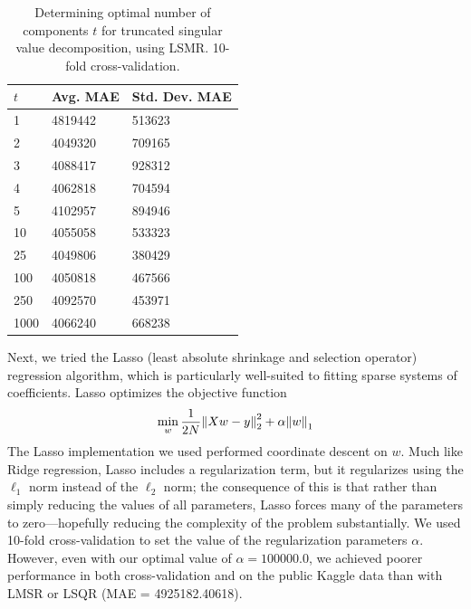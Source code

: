 \documentclass[11pt]{amsart}
\begin{document}
\begin{table}[h]
\begin{tabular}{@{}lll@{}}
\toprule
$t$           & Avg. MAE & Std. Dev. MAE \\ \midrule
1             & 4819442  & 513623        \\
2             & 4049320  & 709165        \\
3             & 4088417  & 928312        \\
4             & 4062818  & 704594        \\
5             & 4102957  & 894946        \\
10            & 4055058  & 533323        \\
25            & 4049806  & 380429        \\
100           & 4050818  & 467566        \\
250           & 4092570  & 453971        \\
1000          & 4066240  & 668238        \\ \bottomrule
\end{tabular}
\caption{Determining optimal number of components $t$ for truncated singular value decomposition, using LSMR. 10-fold cross-validation.}
\end{table}

Next, we tried the Lasso (least absolute shrinkage and selection operator) regression algorithm, which is particularly well-suited to fitting sparse systems of coefficients. Lasso optimizes the objective function
$$\min_w \frac{1}{2 N} \norm{X w - y}_2^2 + \alpha \norm{w}_1$$
The Lasso implementation we used performed coordinate descent on $w$. Much like Ridge regression, Lasso includes a regularization term, but it regularizes using the $\ell_1$ norm instead of the $\ell_2$ norm; the consequence of this is that rather than simply reducing the values of all parameters, Lasso forces many of the parameters to zero---hopefully reducing the complexity of the problem substantially. We used 10-fold cross-validation to set the value of the regularization parameters $\alpha$. However, even with our optimal value of $\alpha = 100000.0$, we achieved poorer performance in both cross-validation and on the public Kaggle data than with LMSR or LSQR (MAE = 4925182.40618). 
\end{document}
